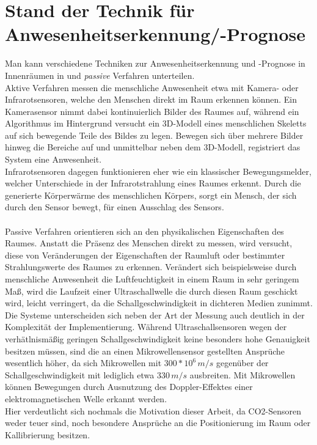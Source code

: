 \clearpage
\chapter{\textbf{Stand der Technik für Anwesenheitserkennung/-Prognose}}\label{grundlagen}

Man kann verschiedene Techniken zur Anwesenheitserkennung und -Prognose in Innenräumen in  und
\textit{passive} Verfahren unterteilen. \\
Aktive Verfahren messen die menschliche Anwesenheit etwa mit 
Kamera- oder Infrarotsensoren, welche den Menschen direkt im Raum erkennen können. Ein Kamerasensor nimmt
dabei kontinuierlich Bilder des Raumes auf, während ein Algorithmus im Hintergrund versucht ein 3D-Modell 
eines menschlichen Skeletts auf sich bewegende Teile des Bildes zu legen. Bewegen sich über mehrere Bilder 
hinweg die Bereiche auf und unmittelbar neben dem 3D-Modell, registriert das System eine Anwesenheit.\\
Infrarotsensoren dagegen funktionieren eher wie ein klassischer Bewegungsmelder, welcher Unterschiede in der 
Infrarotstrahlung eines Raumes erkennt. Durch die generierte Körperwärme des menschlichen Körpers, sorgt ein
Mensch, der sich durch den Sensor bewegt, für einen Ausschlag des Sensors.\\\\

Passive Verfahren orientieren sich an den physikalischen Eigenschaften des Raumes. Anstatt die Präsenz des 
Menschen direkt zu messen, wird versucht, diese von Veränderungen der Eigenschaften der Raumluft oder bestimmter
Strahlungswerte des Raumes zu erkennen. 
Verändert sich beispielsweise durch menschliche Anwesenheit die Luftfeuchtigkeit 
in einem Raum in sehr geringem Maß, wird die  Laufzeit einer Ultraschallwelle die durch diesen Raum 
geschickt wird, leicht verringert, da die Schallgeschwindigkeit in dichteren Medien zunimmt.\\
Die Systeme unterscheiden sich neben der Art der Messung auch deutlich in der Komplexität der Implementierung.
Während Ultraschallsensoren wegen der verhätlnismäßig geringen Schallgeschwindigkeit keine besonders hohe 
Genauigkeit besitzen müssen, sind die an einen Mikrowellensensor gestellten Ansprüche wesentlich höher, da sich
Mikrowellen mit $300*10^6 \,m/s$ gegenüber der Schallgeschwindigkeit mit lediglich etwa $330\, m/s$ ausbreiten.
Mit Mikrowellen können Bewegungen durch Ausnutzung des Doppler-Effektes einer elektromagnetischen Welle erkannt 
werden.\\
Hier verdeutlicht sich nochmals die Motivation dieser Arbeit, da CO2-Sensoren weder teuer sind, noch 
besondere Ansprüche an die Positionierung im Raum oder Kallibrierung besitzen.

